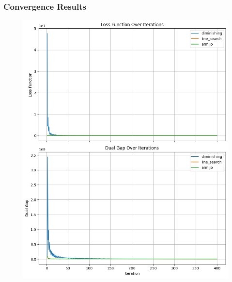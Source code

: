 \documentclass[12pt]{beamer}
\begin{document}
\begin{frame}
    \frametitle{Convergence Results}
    \vspace{-0.5cm}
    \begin{figure}[H]
        \centering
        \includegraphics[height=0.75\textheight]{image/movielens_loss_gap_comparison}
        \hspace{0.5cm}

\end{figure}
\end{frame}
\end{document}
